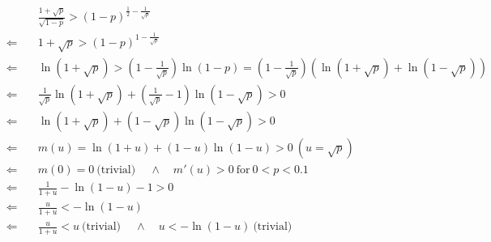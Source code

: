 \documentclass[]{article}
\begin{document}
\begin{align*}
&\frac{1 + \sqrt{p}}{\sqrt{1-p}} >  (1-p)^{\frac{1}{2}-\frac{1}{\sqrt{p}}}\\
\Longleftarrow\quad& 1 + \sqrt{p} >  (1-p)^{1-\frac{1}{\sqrt{p}}}\\
\Longleftarrow\quad& \ln(1+\sqrt{p}) > \left(1-\frac{1}{\sqrt{p}}\right)\ln(1-p) =\left(1-\frac{1}{\sqrt{p}}\right)(\ln(1+\sqrt{p}) + \ln(1 - \sqrt{p})) \\
\Longleftarrow\quad& \frac{1}{\sqrt{p}}\ln(1+\sqrt{p}) + (\frac{1}{\sqrt{p}}-1)\ln(1-\sqrt{p}) > 0\\
\Longleftarrow\quad& \ln(1+\sqrt{p}) + (1-\sqrt{p})\ln(1-\sqrt{p}) > 0\\
\Longleftarrow\quad& m(u) = \ln(1+u) + (1-u)\ln(1-u) > 0\ (u = \sqrt{p})\\
\Longleftarrow\quad& m(0) = 0 \ \mbox{(trivial)} \ \quad\wedge\quad m'(u) > 0 \ \mbox{for}\ 0 < p < 0.1 \\
\Longleftarrow\quad& \frac{1}{1+u} - \ln(1-u) - 1 > 0\\
\Longleftarrow\quad&  \frac{u}{1+u} < - \ln(1-u)\\
\Longleftarrow\quad&  \frac{u}{1+u} <u\ \mbox{(trivial)} \  \quad\wedge\quad u < - \ln(1-u)\ \mbox{(trivial)} \ 
\end{align*}
\end{document}
